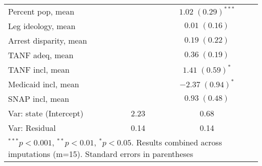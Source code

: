 \begin{table}
\begin{center}
\begin{tabular}{l c c }
Percent pop, mean          &                         & $1.02 \; (0.29)^{***}$  \\
Leg ideology, mean         &                         & $0.01 \; (0.16)$        \\
Arrest disparity, mean     &                         & $0.19 \; (0.22)$        \\
TANF adeq, mean            &                         & $0.36 \; (0.19)$        \\
TANF incl, mean            &                         & $1.41 \; (0.59)^{*}$    \\
Medicaid incl, mean        &                         & $-2.37 \; (0.94)^{*}$   \\
SNAP incl, mean            &                         & $0.93 \; (0.48)$        \\
\hline
Var: state (Intercept)     & 2.23                    & 0.68                    \\
Var: Residual              & 0.14                    & 0.14                    \\
\hline
\multicolumn{3}{l}{\scriptsize{$^{***}p<0.001$, $^{**}p<0.01$, $^*p<0.05$. Results combined across imputations (m=15). Standard errors in parentheses}}
\end{tabular}
\label{table:coefficients}
\end{center}
\end{table}
